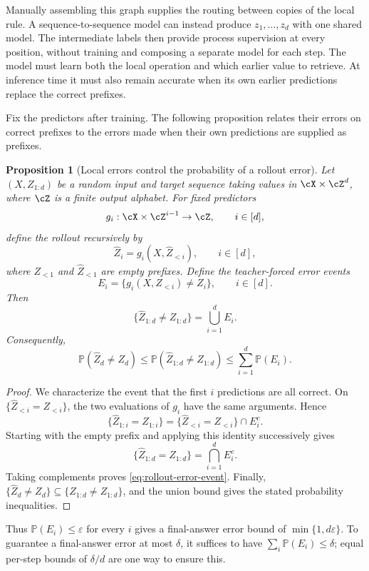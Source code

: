 \documentclass[11pt,twoside]{article}
\renewcommand{\P}{\mathbb P}
\newtheorem{proposition}[theorem]{Proposition}
\theoremstyle{definition}
\theoremstyle{remark}
\begin{document}
Manually assembling this graph supplies the routing between copies of the
local rule. A sequence-to-sequence model can instead produce
$z_1,\ldots,z_d$ with one shared model. The intermediate labels then provide
process supervision at every position, without training and composing a
separate model for each step. The model must learn both the local operation
and which earlier value to retrieve. At inference time it must also remain
accurate when its own earlier predictions replace the correct prefixes.

Fix the predictors after training. The following proposition relates their
errors on correct prefixes to the errors made when their own predictions
are supplied as prefixes.

\begin{proposition}[Local errors control the probability of a rollout error]
\label{prop:rollout-union}
Let $(X,Z_{1:d})$ be a random input and target sequence taking values in
$\cX\times\cZ^d$, where $\cZ$ is a finite output alphabet. For fixed predictors
\[
g_i:\cX\times\cZ^{i-1}\to\cZ,\qquad i\in[d],
\]
define the rollout recursively by
\[
\widehat Z_i=g_i(X,\widehat Z_{<i}),\qquad i\in[d],
\]
where $Z_{<1}$ and $\widehat Z_{<1}$ are empty prefixes. Define the
\emph{teacher-forced error events}
\[
E_i=\{g_i(X,Z_{<i})\ne Z_i\},\qquad i\in[d].
\]
Then
\begin{equation}
\{\widehat Z_{1:d}\ne Z_{1:d}\}=\bigcup_{i=1}^dE_i.
\label{eq:rollout-error-event}
\end{equation}
Consequently,
\[
\P(\widehat Z_d\ne Z_d)
\le\P(\widehat Z_{1:d}\ne Z_{1:d})
\le\sum_{i=1}^d\P(E_i).
\]
\end{proposition}

\begin{proof}
We characterize the event that the first $i$ predictions are all correct.
On $\{\widehat Z_{<i}=Z_{<i}\}$, the two evaluations of $g_i$ have the
same arguments. Hence
\[
\{\widehat Z_{1:i}=Z_{1:i}\}
=\{\widehat Z_{<i}=Z_{<i}\}\cap E_i^c.
\]
Starting with the empty prefix and applying this identity successively gives
\[
\{\widehat Z_{1:d}=Z_{1:d}\}=\bigcap_{i=1}^dE_i^c.
\]
Taking complements proves \cref{eq:rollout-error-event}. Finally,
$\{\widehat Z_d\ne Z_d\}\subseteq
\{\widehat Z_{1:d}\ne Z_{1:d}\}$, and the union bound gives the stated
probability inequalities.
\end{proof}

Thus $\P(E_i)\le\varepsilon$ for every $i$ gives a final-answer error
bound of $\min\{1,d\varepsilon\}$. To guarantee a final-answer error at
most $\delta$, it suffices to have
$\sum_i\P(E_i)\le\delta$; equal per-step bounds of $\delta/d$ are one
way to ensure this.
\end{document}
